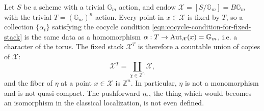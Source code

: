 \begin{example}\label{rl-0009}\label{example:BGm-and-its-fixed-stack}
  Let \(S\) be a scheme with a trivial \(\mathbb G_m\) action, and endow \(\mathcal X = [S/\mathbb G_m] = B\mathbb G_m\) with the trivial \(T = (\mathbb G_m)^n\) action. Every point in \(x \in \mathcal X\) is fixed by \(T\), so a collection \(\{\alpha_t\}\) satisfying the cocycle condition \eqref{eqn:cocycle-condition-for-fixed-stack} is the same data as a homomorphism \(\alpha:T\to \operatorname{Aut}_{\mathcal X}(x) = \mathbb G_m\), i.e. a character of the torus. The fixed stack \(\mathcal X^T\) is therefore a countable union of copies of \(\mathcal X\):
  \[\mathcal X^T = \coprod_{\chi\in \mathbb Z^n} \mathcal X,\]
  and the fiber of \(\eta\) at a point \(x \in \mathcal X\) is \(\mathbb Z^n\). In particular, \(\eta\) is not a monomorphism and is not quasi-compact. The pushforward \(\eta_*\), the thing which would becomes an isomorphism in the classical localization, is not even defined.
\end{example}
